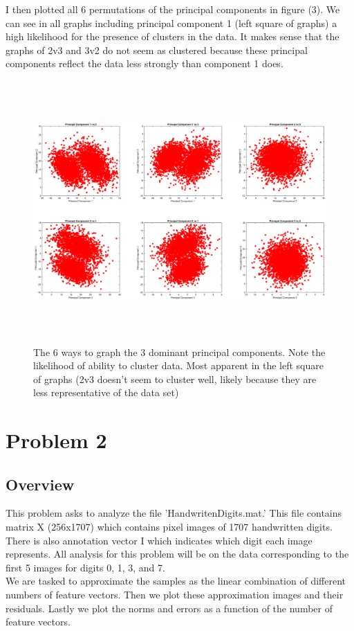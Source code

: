 \documentclass{article}
\begin{document}
\begin{itemize}
    I then plotted all 6 permutations of the principal components in figure (3).  We can see in all graphs including principal component 1 (left square of graphs) a high likelihood for the presence of clusters in the data.  It makes sense that the graphs of 2v3 and 3v2 do not seem as clustered because these principal components reflect the data less strongly than component 1 does.
    \begin{figure}[h!]
        \centerline
        {
        \includegraphics[width=15cm, height=10cm] {Q_1_b_principal_components}
        }
        \caption{\label{fig:my figure} The 6 ways to graph the 3 dominant principal components.  Note the likelihood of ability to cluster data.  Most apparent in the left square of graphs (2v3 doesn't seem to cluster well, likely because they are less representative of the data set) }
    \end{figure}
\end{itemize}
\pagebreak

\pagebreak
\section*{Problem 2}

\subsection*{Overview}
This problem asks to analyze the file 'HandwritenDigits.mat.'  This file contains matrix X (256x1707) which contains pixel images of 1707 handwritten digits.  There is also annotation vector I which indicates which digit each image represents. All analysis for this problem will be on the data corresponding to the first 5 images for digits 0, 1, 3, and 7. \\
We are tasked to approximate the samples as the linear combination of different numbers of feature vectors.  Then we plot these approximation images and their residuals.  Lastly we plot the norms and errors as a function of the number of feature vectors.  
\end{document}

